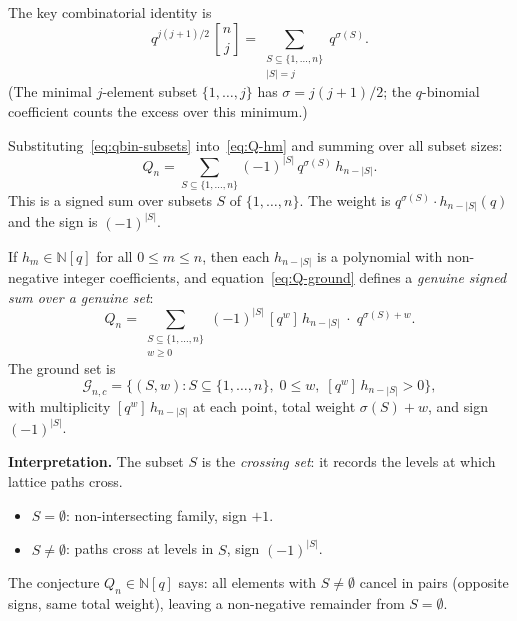 \documentclass[11pt]{article}
\newcommand{\N}{\mathbb{N}}
\newcommand{\qbin}[2]{\genfrac{[}{]}{0pt}{}{#1}{#2}}
\theoremstyle{plain}
\theoremstyle{definition}
\begin{document}
The key combinatorial identity is
\begin{equation}\label{eq:qbin-subsets}
  q^{j(j+1)/2}\, \qbin{n}{j}
  = \sum_{\substack{S \subseteq \{1, \ldots, n\} \\[2pt]
    |S| = j}} q^{\sigma(S)}.
\end{equation}
(The minimal $j$-element subset $\{1, \ldots, j\}$ has
$\sigma = j(j+1)/2$; the $q$-binomial coefficient counts
the excess over this minimum.)

Substituting~\eqref{eq:qbin-subsets}
into~\eqref{eq:Q-hm} and summing over all subset sizes:
\begin{equation}\label{eq:Q-ground}
  \boxed{\;
  Q_n = \sum_{S \subseteq \{1, \ldots, n\}}
    (-1)^{|S|}\, q^{\sigma(S)}\, h_{n - |S|}.
  \;}
\end{equation}
This is a signed sum over subsets $S$ of $\{1, \ldots, n\}$.
The weight is $q^{\sigma(S)} \cdot h_{n-|S|}(q)$
and the sign is $(-1)^{|S|}$.

If $h_m \in \N[q]$ for all $0 \leq m \leq n$, then each
$h_{n-|S|}$ is a polynomial with non-negative integer
coefficients, and equation~\eqref{eq:Q-ground} defines a
\emph{genuine signed sum over a genuine set}:
\begin{equation}\label{eq:Q-elements}
  Q_n = \sum_{\substack{S \subseteq \{1, \ldots, n\}
    \\[2pt] w \geq 0}}
    (-1)^{|S|}\, [q^w]\, h_{n-|S|}
    \;\cdot\; q^{\sigma(S) + w}.
\end{equation}
The ground set is
\[
  \mathcal{G}_{n,c}
  = \bigl\{(S, w) : S \subseteq \{1, \ldots, n\},\;
    0 \leq w,\; [q^w]\, h_{n-|S|} > 0 \bigr\},
\]
with multiplicity $[q^w]\, h_{n-|S|}$ at each point,
total weight $\sigma(S) + w$, and sign $(-1)^{|S|}$.

\medskip
\noindent\textbf{Interpretation.}\; The subset $S$ is the
\emph{crossing set}: it records the levels at which
lattice paths cross.
\begin{itemize}
  \item $S = \emptyset$: non-intersecting family, sign $+1$.
  \item $S \neq \emptyset$: paths cross at levels in $S$,
    sign $(-1)^{|S|}$.
\end{itemize}
The conjecture $Q_n \in \N[q]$ says: all elements with
$S \neq \emptyset$ cancel in pairs (opposite signs, same
total weight), leaving a non-negative remainder from
$S = \emptyset$.


\end{document}
